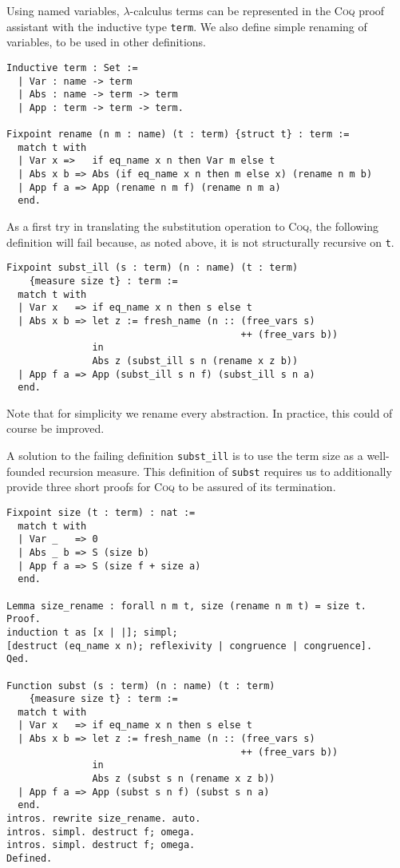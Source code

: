 \documentclass[a4paper,11pt]{article}
\newcommand{\name}[1]{\textsc{#1}\xspace}
\def\Coq{\name{Coq}}
\begin{document}
Using named variables, $\lambda$-calculus terms can be represented in the
\Coq proof assistant with the inductive type \lstinline{term}. We also
define simple renaming of variables, to be used in other definitions.
\begin{lstlisting}
Inductive term : Set :=
  | Var : name -> term
  | Abs : name -> term -> term
  | App : term -> term -> term.

Fixpoint rename (n m : name) (t : term) {struct t} : term :=
  match t with
  | Var x =>   if eq_name x n then Var m else t
  | Abs x b => Abs (if eq_name x n then m else x) (rename n m b)
  | App f a => App (rename n m f) (rename n m a)
  end.
\end{lstlisting}

As a first try in translating the substitution operation to \Coq, the
following definition will fail because, as noted above, it is not
structurally recursive on \lstinline{t}.
\begin{lstlisting}
Fixpoint subst_ill (s : term) (n : name) (t : term)
    {measure size t} : term :=
  match t with
  | Var x   => if eq_name x n then s else t
  | Abs x b => let z := fresh_name (n :: (free_vars s)
                                         ++ (free_vars b))
               in
               Abs z (subst_ill s n (rename x z b))
  | App f a => App (subst_ill s n f) (subst_ill s n a)
  end.
\end{lstlisting}
Note that for simplicity we rename every abstraction. In practice,
this could of course be improved.

A solution to the failing definition \lstinline{subst_ill} is to use
the term size as a well-founded recursion
measure. This definition of \lstinline{subst} requires us to
additionally provide three short proofs for \Coq to be assured of its
termination.
\begin{lstlisting}
Fixpoint size (t : term) : nat :=
  match t with
  | Var _   => 0
  | Abs _ b => S (size b)
  | App f a => S (size f + size a)
  end.

Lemma size_rename : forall n m t, size (rename n m t) = size t.
Proof.
induction t as [x | |]; simpl;
[destruct (eq_name x n); reflexivity | congruence | congruence].
Qed.

Function subst (s : term) (n : name) (t : term)
    {measure size t} : term :=
  match t with
  | Var x   => if eq_name x n then s else t
  | Abs x b => let z := fresh_name (n :: (free_vars s)
                                         ++ (free_vars b))
               in
               Abs z (subst s n (rename x z b))
  | App f a => App (subst s n f) (subst s n a)
  end.
intros. rewrite size_rename. auto.
intros. simpl. destruct f; omega.
intros. simpl. destruct f; omega.
Defined.
\end{lstlisting}
\end{document}
